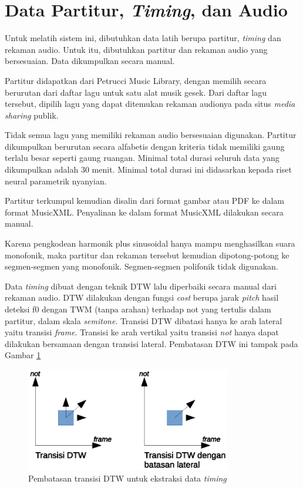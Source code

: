 \section{Data Partitur, \textit{Timing}, dan Audio} \label{datacollectionsection}

Untuk melatih sistem ini, dibutuhkan data latih berupa partitur, \textit{timing} dan rekaman audio. Untuk itu, dibutuhkan partitur dan rekaman audio yang bersesuaian. Data dikumpulkan secara manual.

Partitur didapatkan dari Petrucci Music Library, dengan memilih secara berurutan dari daftar lagu untuk satu alat musik gesek. Dari daftar lagu tersebut, dipilih lagu yang dapat ditemukan rekaman audionya pada situs \textit{media sharing} publik.

Tidak semua lagu yang memiliki rekaman audio bersesuaian digunakan. Partitur dikumpulkan berurutan secara alfabetis dengan kriteria tidak memiliki gaung terlalu besar seperti gaung ruangan. Minimal total durasi seluruh data yang dikumpulkan adalah 30 menit. Minimal total durasi ini didasarkan kepada riset neural parametrik nyanyian.

Partitur terkumpul kemudian disalin dari format gambar atau PDF ke dalam format MusicXML. Penyalinan ke dalam format MusicXML dilakukan secara manual.

Karena pengkodean harmonik plus sinusoidal hanya mampu menghasilkan suara monofonik, maka partitur dan rekaman tersebut kemudian dipotong-potong ke segmen-segmen yang monofonik. Segmen-segmen polifonik tidak digunakan.

Data \textit{timing} dibuat dengan teknik DTW lalu diperbaiki secara manual dari rekaman audio. DTW dilakukan dengan fungsi \textit{cost} berupa jarak \textit{pitch} hasil deteksi f0 dengan TWM (tanpa arahan) terhadap  not yang tertulis dalam partitur, dalam skala \textit{semitone}. Transisi DTW dibatasi hanya ke arah lateral yaitu transisi \textit{frame}. Transisi ke arah vertikal yaitu transisi \textit{not} hanya dapat dilakukan bersamaan dengan transisi lateral. Pembatasan DTW ini tampak pada Gambar \ref{fig-dtw-transition}

\begin{figure}[htb]
    \centering
    \includegraphics[width=0.8\textwidth]{resources/DTW-transition.eps}
    \caption{Pembatasan transisi DTW untuk ekstraksi data \textit{timing}}\label{fig-dtw-transition}
\end{figure}

